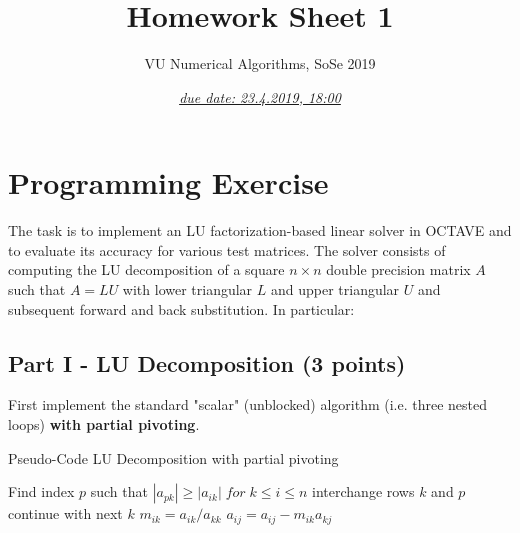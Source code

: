 \documentclass{scrartcl}
\title{Homework Sheet 1}
\subtitle{VU Numerical Algorithms, SoSe 2019}
\date{\underline{\emph{due date: 23.4.2019, 18:00}}}
\newenvironment{mymdframed}[1]{%
\mdfsetup{%
frametitle={\colorbox{white}{\,#1\,}},
frametitleaboveskip=-\ht\strutbox,
frametitlealignment=\raggedright
}%
\begin{mdframed}[style=exampledefault]
}{\end{mdframed}}
\begin{document}
\maketitle



\section*{Programming Exercise}
    The task is to implement an LU factorization-based linear solver in OCTAVE and to evaluate its accuracy for various test matrices. The solver consists of computing the LU decomposition of a square $n \times n$ double precision matrix $A$ such that $A = LU$ with lower triangular $L$ and upper triangular $U$ and subsequent forward and back substitution. In particular:
        
    \subsection*{Part I - LU Decomposition (3 points)}
        First implement the standard "scalar" (unblocked) algorithm (i.e. three nested loops) \textbf{with partial pivoting}.
        
        \begin{algorithm}
            \caption{Pseudo-Code LU Decomposition with partial pivoting}
            \begin{algorithmic}
                    \STATE Find index $p$ such that
                    \STATE $|a_{pk}| \geq |a_{ik}| \; for \; k \leq i \leq n$
                        \STATE interchange rows $k$ and $p$
                    \ENDIF
                        \STATE continue with next $k$
                    \ENDIF
                        \STATE $m_{ik} = a_{ik} / a_{kk}$
                    \ENDFOR
                            \STATE $a_{ij} = a_{ij} - m_{ik}a_{kj}$
                        \ENDFOR
                    \ENDFOR
                \ENDFOR
            \end{algorithmic}
        \end{algorithm}
    
\end{document}
